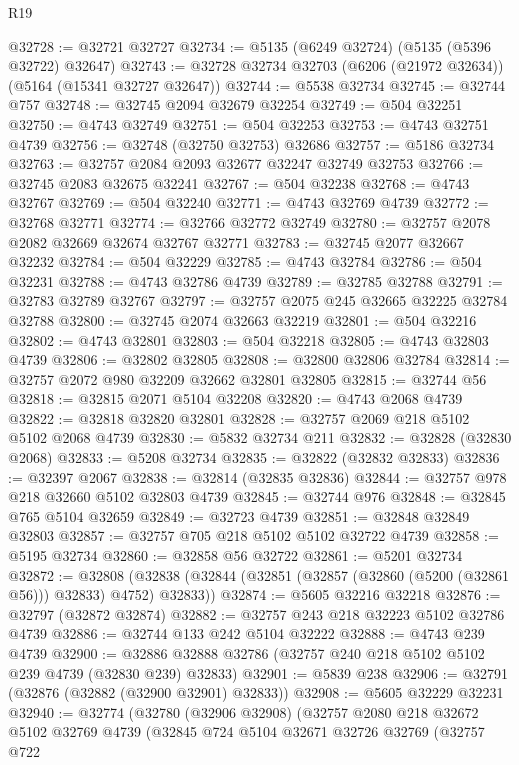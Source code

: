 \begin{lexlean}{R19}
\begin{coremodule}
{{{{{{{{{{{@32728 := @32721 @32727
@32734 := @5135 (@6249 @32724) (@5135 (@5396 @32722) @32647)
@32743 := @32728 @32734 @32703 (@6206 (@21972 @32634)) (@5164 (@15341 @32727 @32647))
@32744 := @5538 @32734
@32745 := @32744 @757
@32748 := @32745 @2094 @32679 @32254
@32749 := @504 @32251
@32750 := @4743 @32749
@32751 := @504 @32253
@32753 := @4743 @32751 @4739
@32756 := @32748 (@32750 @32753) @32686
@32757 := @5186 @32734
@32763 := @32757 @2084 @2093 @32677 @32247 @32749 @32753
@32766 := @32745 @2083 @32675 @32241
@32767 := @504 @32238
@32768 := @4743 @32767
@32769 := @504 @32240
@32771 := @4743 @32769 @4739
@32772 := @32768 @32771
@32774 := @32766 @32772 @32749
@32780 := @32757 @2078 @2082 @32669 @32674 @32767 @32771
@32783 := @32745 @2077 @32667 @32232
@32784 := @504 @32229
@32785 := @4743 @32784
@32786 := @504 @32231
@32788 := @4743 @32786 @4739
@32789 := @32785 @32788
@32791 := @32783 @32789 @32767
@32797 := @32757 @2075 @245 @32665 @32225 @32784 @32788
@32800 := @32745 @2074 @32663 @32219
@32801 := @504 @32216
@32802 := @4743 @32801
@32803 := @504 @32218
@32805 := @4743 @32803 @4739
@32806 := @32802 @32805
@32808 := @32800 @32806 @32784
@32814 := @32757 @2072 @980 @32209 @32662 @32801 @32805
@32815 := @32744 @56
@32818 := @32815 @2071 @5104 @32208
@32820 := @4743 @2068 @4739
@32822 := @32818 @32820 @32801
@32828 := @32757 @2069 @218 @5102 @5102 @2068 @4739
@32830 := @5832 @32734 @211
@32832 := @32828 (@32830 @2068)
@32833 := @5208 @32734
@32835 := @32822 (@32832 @32833)
@32836 := @32397 @2067
@32838 := @32814 (@32835 @32836)
@32844 := @32757 @978 @218 @32660 @5102 @32803 @4739
@32845 := @32744 @976
@32848 := @32845 @765 @5104 @32659
@32849 := @32723 @4739
@32851 := @32848 @32849 @32803
@32857 := @32757 @705 @218 @5102 @5102 @32722 @4739
@32858 := @5195 @32734
@32860 := @32858 @56 @32722
@32861 := @5201 @32734
@32872 := @32808
    (@32838 (@32844 (@32851 (@32857 (@32860 (@5200 (@32861 @56))) @32833) @4752) @32833))
@32874 := @5605 @32216 @32218
@32876 := @32797 (@32872 @32874)
@32882 := @32757 @243 @218 @32223 @5102 @32786 @4739
@32886 := @32744 @133 @242 @5104 @32222
@32888 := @4743 @239 @4739
@32900 := @32886 @32888 @32786 (@32757 @240 @218 @5102 @5102 @239 @4739 (@32830 @239) @32833)
@32901 := @5839 @238
@32906 := @32791 (@32876 (@32882 (@32900 @32901) @32833))
@32908 := @5605 @32229 @32231
@32940 := @32774
    (@32780
      (@32906 @32908)
      (@32757
        @2080
        @218
        @32672
        @5102
        @32769
        @4739
        (@32845
          @724
          @5104
          @32671
          @32726
          @32769
          (@32757
            @722
}}}}}}}}}}}
\end{coremodule}
\end{lexlean}

